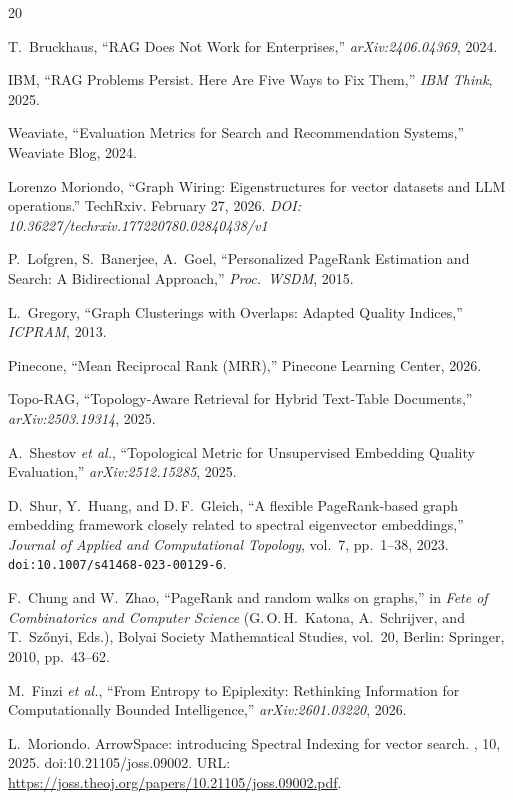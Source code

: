 \documentclass[11pt,a4paper]{article}
\begin{document}
\begin{thebibliography}{20}

T.~Bruckhaus, ``RAG Does Not Work for Enterprises,''
\emph{arXiv:2406.04369}, 2024.

IBM, ``RAG Problems Persist. Here Are Five Ways to Fix Them,''
\emph{IBM Think}, 2025.

Weaviate, ``Evaluation Metrics for Search and Recommendation Systems,''
Weaviate Blog, 2024.

Lorenzo Moriondo,  ``Graph Wiring: Eigenstructures for vector datasets and LLM operations.'' TechRxiv. February 27, 2026.
\emph{DOI: 10.36227/techrxiv.177220780.02840438/v1}

P.~Lofgren, S.~Banerjee, A.~Goel, ``Personalized PageRank Estimation
and Search: A Bidirectional Approach,''
\emph{Proc.\ WSDM}, 2015.

L.~Gregory, ``Graph Clusterings with Overlaps: Adapted Quality Indices,''
\emph{ICPRAM}, 2013.

Pinecone, ``Mean Reciprocal Rank (MRR),'' Pinecone Learning Center, 2026.

Topo-RAG, ``Topology-Aware Retrieval for Hybrid Text-Table Documents,''
\emph{arXiv:2503.19314}, 2025.

A.~Shestov \emph{et al.}, ``Topological Metric for Unsupervised Embedding
Quality Evaluation,'' \emph{arXiv:2512.15285}, 2025.

D.~Shur, Y.~Huang, and D.\,F.~Gleich,
``A flexible PageRank-based graph embedding framework closely related to
spectral eigenvector embeddings,''
\textit{Journal of Applied and Computational Topology}, vol.~7, pp.~1--38,
2023.
\newblock \texttt{doi:10.1007/s41468-023-00129-6}.

F.~Chung and W.~Zhao,
``PageRank and random walks on graphs,''
in \textit{Fete of Combinatorics and Computer Science}
(G.\,O.\,H.~Katona, A.~Schrijver, and T.~Sz\H{o}nyi, Eds.),
Bolyai Society Mathematical Studies, vol.~20,
Berlin: Springer, 2010, pp.~43--62.

M.~Finzi \emph{et al.}, ``From Entropy to Epiplexity: Rethinking
Information for Computationally Bounded Intelligence,''
\emph{arXiv:2601.03220}, 2026.

L.~Moriondo.
\newblock ArrowSpace: introducing Spectral Indexing for vector search.
, 10, 2025.
\newblock doi:10.21105/joss.09002.
\newblock URL: \url{https://joss.theoj.org/papers/10.21105/joss.09002.pdf}. 

\end{thebibliography}
\end{document}
